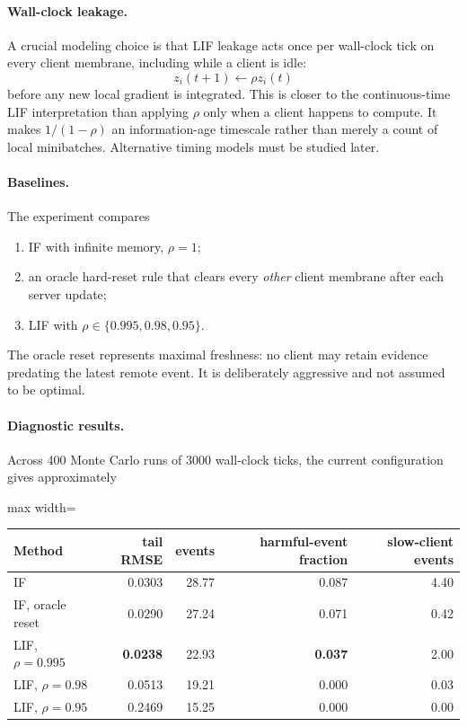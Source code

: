 \paragraph{Wall-clock leakage.}
A crucial modeling choice is that LIF leakage acts once per wall-clock tick on every client membrane, including while a client is idle:
\begin{equation}
  z_i(t+1)\leftarrow \rho z_i(t)
\end{equation}
before any new local gradient is integrated. This is closer to the continuous-time LIF interpretation than applying $\rho$ only when a client happens to compute. It makes $1/(1-\rho)$ an information-age timescale rather than merely a count of local minibatches. Alternative timing models must be studied later.

\paragraph{Baselines.}
The experiment compares
\begin{enumerate}
  \item IF with infinite memory, $\rho=1$;
  \item an oracle hard-reset rule that clears every \emph{other} client membrane after each server update;
  \item LIF with $\rho\in\{0.995,0.98,0.95\}$.
\end{enumerate}
The oracle reset represents maximal freshness: no client may retain evidence predating the latest remote event. It is deliberately aggressive and not assumed to be optimal.

\paragraph{Diagnostic results.}
Across 400 Monte Carlo runs of 3000 wall-clock ticks, the current configuration gives approximately
\begin{center}
\begin{adjustbox}{max width=\textwidth}
\begin{tabular}{lrrrr}
\toprule
Method & tail RMSE & events & harmful-event fraction & slow-client events \\
\midrule
IF & 0.0303 & 28.77 & 0.087 & 4.40 \\
IF, oracle reset & 0.0290 & 27.24 & 0.071 & 0.42 \\
LIF, $\rho=0.995$ & \textbf{0.0238} & 22.93 & \textbf{0.037} & 2.00 \\
LIF, $\rho=0.98$ & 0.0513 & 19.21 & 0.000 & 0.03 \\
LIF, $\rho=0.95$ & 0.2469 & 15.25 & 0.000 & 0.00 \\
\bottomrule
\end{tabular}
\end{adjustbox}
\end{center}


